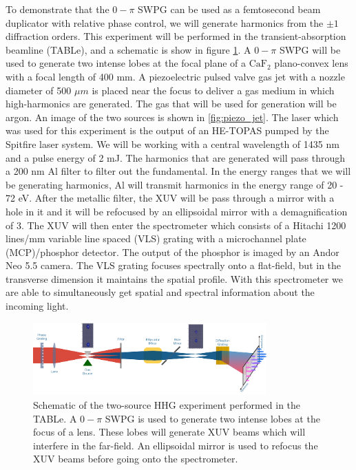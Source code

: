 To demonstrate that the $0-\pi$ SWPG can be used as a femtosecond beam duplicator with relative phase control, we will generate harmonics from the $\pm1$ diffraction orders.  This experiment will be performed in the transient-absorption beamline (TABLe), and a schematic is show in figure \ref{fig:schematic}.  A $0-\pi$ SWPG will be used to generate two intense lobes at the focal plane of a $\mathrm{CaF}_2$ plano-convex lens with a focal length of 400 mm.  A piezoelectric pulsed valve gas jet with a nozzle diameter of 500 $\mu m$ is placed near the focus to deliver a gas medium in which high-harmonics are generated.  The gas that will be used for generation will be argon.  An image of the two sources is shown in \ref{fig:piezo_jet}.  The laser which was used for this experiment is the output of an HE-TOPAS pumped by the Spitfire laser system.  We will be working with a central wavelength of 1435 nm and a pulse energy of 2 mJ.  The harmonics that are generated will pass through a 200 nm Al filter to filter out the fundamental. In the energy ranges that we will be generating harmonics, Al will transmit harmonics in the energy range of 20 - 72 eV.  After the metallic filter, the XUV will be pass through a mirror with a hole in it and it will be refocused by an ellipsoidal mirror with a demagnification of 3.  The XUV will then enter the spectrometer which consists of a Hitachi 1200 lines/mm variable line spaced (VLS) grating with a microchannel plate (MCP)/phosphor detector.  The output of the phosphor is imaged by an Andor Neo 5.5 camera.  The VLS grating focuses spectrally onto a flat-field, but in the transverse dimension it maintains the spatial profile. With this spectrometer we are able to simultaneously get spatial and spectral information about the incoming light.
\begin{figure}
	\centering
	\includegraphics[width=0.8\textwidth]{figures/Two_source/schematic_table.png}
	\caption{Schematic of the two-source HHG experiment performed in the TABLe. A $0-\pi$ SWPG is used to generate two intense lobes at the focus of a lens.  These lobes will generate XUV beams which will interfere in the far-field.  An ellipsoidal mirror is used to refocus the XUV beams before going onto the spectrometer.}
	\label{fig:schematic}
\end{figure}
